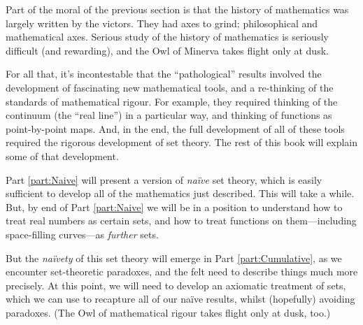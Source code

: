 \documentclass[../../../include/open-logic-section]{subfiles}
\begin{document}
Part of the moral of the previous section is that the history of mathematics was largely written by the victors. They had axes to grind; philosophical and mathematical axes. Serious study of the history of mathematics is seriously difficult (and rewarding), and the Owl of Minerva takes flight only at dusk.

For all that, it's incontestable that the ``pathological'' results involved the development of fascinating new mathematical tools, and a re-thinking of the standards of mathematical rigour. For example, they required thinking of the continuum (the ``real line'') in a particular way, and thinking of functions as point-by-point maps. And, in the end, the full development of all of these tools required the rigorous development of set theory. The rest of this book will explain some of that development.

Part \ref{part:Naive} will present a version of \emph{na\"ive} set theory, which is easily sufficient to develop all of the mathematics just described. This will take a while. But, by end of Part \ref{part:Naive} we will be in a position to understand how to treat real numbers as certain sets, and how to treat functions on them---including space-filling curves---as \emph{further} sets. 

But the \emph{na\"ivety} of this set theory will emerge in Part \ref{part:Cumulative}, as we encounter set-theoretic paradoxes, and the felt need to describe things much more precisely. At this point, we will need to develop an axiomatic treatment of sets, which we can use to recapture all of our na\"ive results, whilst (hopefully) avoiding paradoxes. (The Owl of mathematical rigour takes flight only at dusk, too.)
\end{document}
